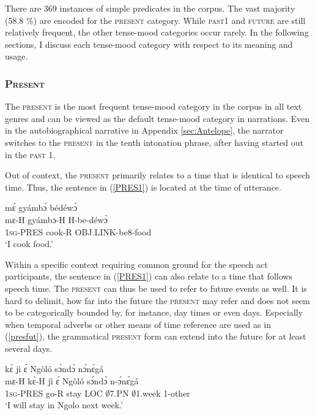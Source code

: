 \noindent  There are 369 instances of simple predicates in the corpus. The vast majority (58.8 \%) are encoded for the \textsc{present} category. While \textsc{past1} and \textsc{future} are still relatively frequent, the other tense-mood categories occur rarely. In the following sections, I discuss each tense-mood category with respect to its meaning and usage.








\subsubsection{\textsc{Present}}
\label{sec:pres}

The \textsc{present} is the most frequent tense-mood category in the corpus in all text genres and can be viewed as the default tense-mood category in narrations. Even in the autobiographical narrative in Appendix \ref{sec:Antelope}, the narrator switches to the \textsc{present} in the tenth intonation phrase, after having started out in the \textsc{past 1}.  

Out of context, the \textsc{present} primarily relates to a time that is identical to speech time. Thus, the sentence in (\ref{PRES1}) is located at the time of utterance.


\begin{exe} 
\ex\label{PRES1} 
  \glll  mɛ́ gyámbɔ́ bédéwɔ̀ \\
         mɛ-H gyámbɔ-H H-be-déwɔ̀ \\
            1\textsc{sg}-PRES cook-R OBJ.LINK-be8-food \\
    \trans `I cook food.'
\end{exe}

\noindent Within a specific context requiring common ground for the speech act participants, the sentence in (\ref{PRES1}) can also relate to a time that follows speech time. The \textsc{present} can thus be used to refer to future events as well. It is hard to delimit, how far into the future the \textsc{present} may refer and does not seem to be categorically bounded by, for instance, day times or even days. Especially when temporal adverbs or other means of time reference are used as in (\ref{presfut}), the grammatical \textsc{present} form can extend into the future for at least several days. 

\begin{exe} 
\ex\label{presfut}
   kɛ́ jì ɛ́ Ngòló sɔ́ndɔ̀ nɔ́nɛ́gá \\
         mɛ-H kɛ̀-H jì ɛ́ Ngòló sɔ́ndɔ̀ n-ɔ́nɛ́gá \\
          1\textsc{sg}-PRES go-R stay LOC $\emptyset$7.PN $\emptyset$1.week 1-other  \\
    \trans `I will stay in Ngolo next week.'
\end{exe}



